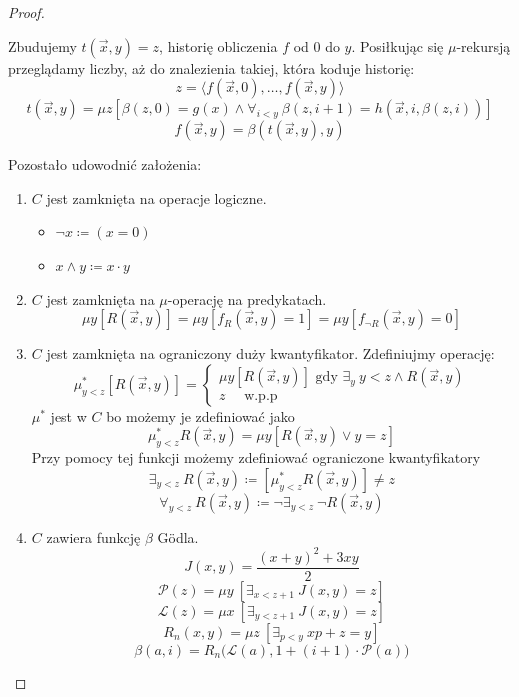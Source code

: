 \begin{proof}
\begin{enumerate}
    Zbudujemy \(t(\vec{x},y) = z\), historię obliczenia \(f\) od \(0\) do \(y\). Posiłkując się \(\mu\)-rekursją przeglądamy liczby, aż do znalezienia takiej, która koduje historię:
    \[ z = \langle f(\vec{x},0), \dots, f(\vec{x},y) \rangle \]
    \[ t(\vec{x},y) = \mu z [\beta(z,0) = g(x) \land \forall_{i<y} \ \beta(z,i+1) = h(\vec{x}, i,\beta({z,i}))]
    \]
    \[ f(\vec{x},y) = \beta(t(\vec{x},y),y) \]
\end{enumerate}
Pozostało udowodnić założenia:
\begin{enumerate}
    \item \(C\) jest zamknięta na operacje logiczne.
    \begin{itemize}
        \item \(\neg x \coloneq (x=0)\)
        \item \(x \land y \coloneq x\cdot y\)
    \end{itemize}
    \item \(C\) jest zamknięta na \(\mu\)-operację na predykatach.
    \[ \mu y [R(\vec{x},y)] = \mu y[f_R(\vec{x},y) = 1] = \mu y [f_{\neg R} (\vec{x},y) = 0] \]
    \item \(C\) jest zamknięta na ograniczony duży kwantyfikator.
    Zdefiniujmy operację:
    \[ \mu^*_{y<z} [R(\vec{x},y)] = \begin{cases}
        \mu y [R(\vec{x},y)] \text{ gdy \(\exists_y \ y<z \land R(\vec{x},y)\)}\\
        z \quad \text{ w.p.p}
    \end{cases} \]
    \(\mu^*\) jest w \(C\) bo możemy je zdefiniować jako
    \[ \mu^*_{y<z} R(\vec{x},y) = \mu y[R(\vec{x},y) \lor y = z] \]
    Przy pomocy tej funkcji możemy zdefiniować ograniczone kwantyfikatory
    \[ \exists_{y<z} \ R(\vec{x},y) \coloneq [\mu^*_{y<z} R(\vec{x},y)]\neq z \]
    \[ \forall_{y<z} \ R(\vec{x},y) \coloneq \neg  \exists_{y<z} \ \neg R(\vec{x},y) \]
    \item \(C\) zawiera funkcję \(\beta\) G\"odla.
    \[ J(x,y) = \frac{(x+y)^2+3xy}{2} \]
    \[ \mathcal{P}(z) = \mu y \: [\exists_{x<z+1} \ J(x,y) = z] \] 
    \[ \mathcal{L}(z) = \mu x \: [\exists_{y<z+1} \ J(x,y) = z] \] 
    \[ R_n(x,y) = \mu z \: [\exists_{p<y} \ xp+z = y] \]
    \[ \beta(a,i) = R_n\big(\mathcal{L}(a), 1+(i+1) \cdot \mathcal{P}(a)\big) \]
\end{enumerate}
\end{proof}
